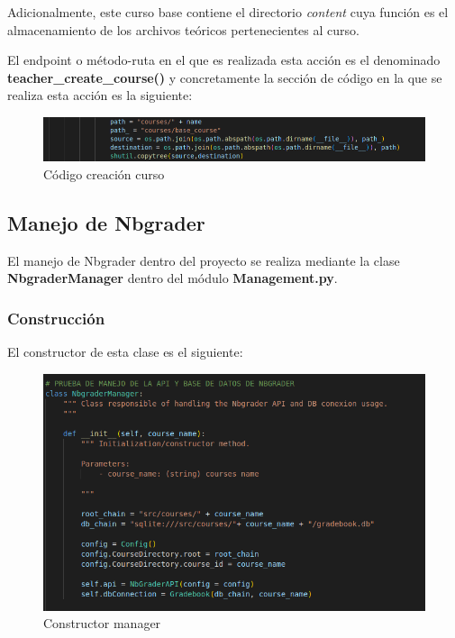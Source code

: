 Adicionalmente, este curso base contiene el directorio \textit{content} cuya función es el almacenamiento de los archivos teóricos pertenecientes al curso.

El endpoint o método-ruta en el que es realizada esta acción es el denominado \textbf{teacher\_create\_course()} y concretamente la sección de código en la que se realiza esta acción es la siguiente:

\begin{figure}[H]
    \centering
    \includegraphics[scale=0.8]{img/imgs-memoria/Code_createCourse.PNG}
    \caption{Código creación curso}
\end{figure}


\subsection{Manejo de Nbgrader}
El manejo de Nbgrader dentro del proyecto se realiza mediante la clase \textbf{NbgraderManager} dentro del módulo \textbf{Management.py}.

\subsubsection{Construcción}
El constructor de esta clase es el siguiente:

\begin{figure}[H]
    \centering
    \includegraphics[scale=0.8]{img/imgs-memoria/ConstructorManager.PNG}
    \caption{Constructor manager}
\end{figure}

